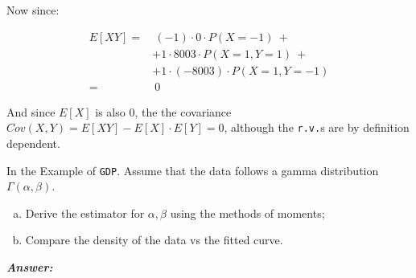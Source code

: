 \documentclass[12pt]{article}
\newenvironment{question}[2][Question]{\begin{trivlist}
\item[\hskip \labelsep {\bfseries #1}\hskip \labelsep {\bfseries #2.}]}{\end{trivlist}}
\begin{document}
Now since:

\begin{align*}
E[XY] = & \  (-1) \cdot 0 \cdot P(X = - 1)  \ + \\
&+1 \cdot 8003 \cdot P(X = 1, Y = 1) \ + \\
& +1 \cdot (-8003) \cdot P(X = 1, Y = -1)  \\
=& \ 0
\end{align*}

And since $E[X]$ is also $0$, the
the covariance $Cov(X, Y) = E[XY] - E[X] \cdot E[Y] = 0$, although the \texttt{r.v.}s are by definition dependent.

\bigskip
\bigskip

\begin{question}{3.3}

In the Example of \texttt{GDP}. Assume that the data follows a gamma distribution $\Gamma(\alpha, \beta)$.

\begin{enumerate}[(a)]
\item Derive the estimator for $\alpha, \beta$ using the methods of moments;
\item Compare the density of the data vs the fitted curve.
\end{enumerate}

\end{question}

 \textbf{\color{TealBlue}\emph{Answer:} } 
\end{document}
